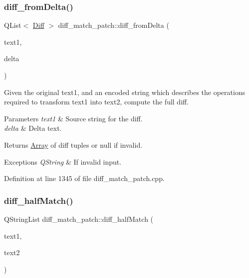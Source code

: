 \subsubsection{\texorpdfstring{diff\+\_\+from\+Delta()}{diff\_fromDelta()}}
{\footnotesize\ttfamily Q\+List$<$ \hyperlink{class_diff}{Diff} $>$ diff\+\_\+match\+\_\+patch\+::diff\+\_\+from\+Delta (\begin{DoxyParamCaption}\item[{const Q\+String \&}]{text1,  }\item[{const Q\+String \&}]{delta }\end{DoxyParamCaption})}

Given the original text1, and an encoded string which describes the operations required to transform text1 into text2, compute the full diff. 
\begin{DoxyParams}{Parameters}
{\em text1} & Source string for the diff. \\
\hline
{\em delta} & Delta text. \\
\hline
\end{DoxyParams}
\begin{DoxyReturn}{Returns}
\hyperlink{class_array}{Array} of diff tuples or null if invalid. 
\end{DoxyReturn}

\begin{DoxyExceptions}{Exceptions}
{\em Q\+String} & If invalid input. \\
\hline
\end{DoxyExceptions}


Definition at line 1345 of file diff\+\_\+match\+\_\+patch.\+cpp.

\mbox{\label{classdiff__match__patch_a34e2eabd2503e28eebe97a05dc3783dc}} 
\subsubsection{\texorpdfstring{diff\+\_\+half\+Match()}{diff\_halfMatch()}}
{\footnotesize\ttfamily Q\+String\+List diff\+\_\+match\+\_\+patch\+::diff\+\_\+half\+Match (\begin{DoxyParamCaption}\item[{const Q\+String \&}]{text1,  }\item[{const Q\+String \&}]{text2 }\end{DoxyParamCaption})\hspace{0.3cm}{\ttfamily [protected]}}

